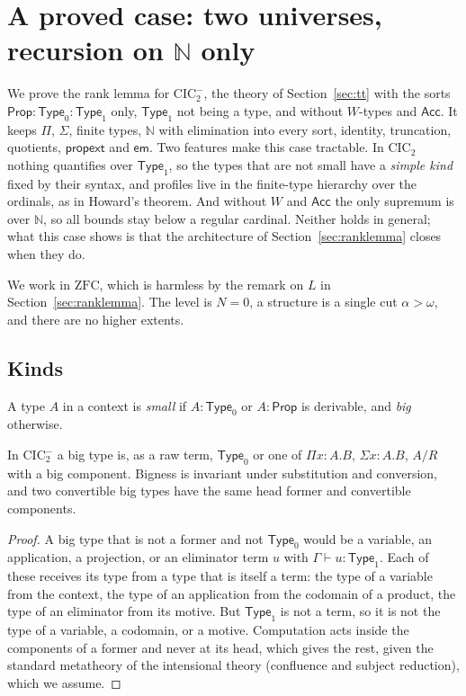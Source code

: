 \documentclass[10pt]{article}
\newcommand{\N}{\mathbb{N}}
\newcommand{\Prop}{\mathsf{Prop}}
\newcommand{\Type}{\mathsf{Type}}
\newcommand{\CIC}{\mathrm{CIC}}
\newcommand{\ZFC}{\mathrm{ZFC}}
\newcommand{\Acc}{\mathsf{Acc}}
\begin{document}
\section{A proved case: two universes, recursion on $\N$ only}\label{sec:proved}

We prove the rank lemma for $\CIC_2^-$, the theory of
Section~\ref{sec:tt} with the sorts $\Prop:\Type_0:\Type_1$ only, $\Type_1$
not being a type, and without $W$-types and $\Acc$. It keeps $\Pi$,
$\Sigma$, finite types, $\N$ with elimination into every sort, identity,
truncation, quotients, $\mathsf{propext}$ and $\mathsf{em}$. Two features
make this case tractable. In $\CIC_2$ nothing quantifies over $\Type_1$,
so the types that are not small have a \emph{simple kind} fixed by their
syntax, and profiles live in the finite-type hierarchy over the
ordinals, as in Howard's theorem. And without $W$ and $\Acc$ the only
supremum is over $\N$, so all bounds stay below a regular cardinal.
Neither holds in general; what this case shows is that the architecture
of Section~\ref{sec:ranklemma} closes when they do.

We work in $\ZFC$, which is harmless by the remark on $L$ in
Section~\ref{sec:ranklemma}. The level is $N=0$, a structure is a single
cut $\alpha>\omega$, and there are no higher extents.

\subsection{Kinds}

A type $A$ in a context is \emph{small} if $A:\Type_0$ or $A:\Prop$ is
derivable, and \emph{big} otherwise.

\begin{lemma}\label{lem:rigid}
In $\CIC_2^-$ a big type is, as a raw term, $\Type_0$ or one of
$\Pi x{:}A.B$, $\Sigma x{:}A.B$, $A/R$ with a big component. Bigness is
invariant under substitution and conversion, and two convertible big
types have the same head former and convertible components.
\end{lemma}
\begin{proof}
A big type that is not a former and not $\Type_0$ would be a variable,
an application, a projection, or an eliminator term $u$ with
$\Gamma\vdash u:\Type_1$. Each of these receives its type from a type
that is itself a term: the type of a variable from the context, the
type of an application from the codomain of a product, the type of an
eliminator from its motive. But $\Type_1$ is not a term, so it is not
the type of a variable, a codomain, or a motive. Computation acts inside
the components of a former and never at its head, which gives the rest,
given the standard metatheory of the intensional theory (confluence and
subject reduction), which we assume.
\end{proof}
\end{document}
